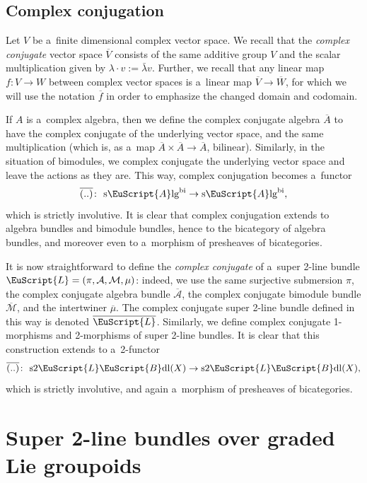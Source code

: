 \documentclass[10pt,a4paper]{amsart}
\numberwithin{equation}{section}
\def\mathscr#1{\EuScript{#1}}
\newcommand{\LineBdl}{\mathscr{L}\mathscr{B}\mathrm{dl}}
\newcommand{\stwoLineBdl}{\mathrm{s}2\LineBdl}
\newcommand{\Alg}{\Incl\mathrm{lg}}
\newcommand{\sAlg}{\mathrm{s}\Alg}
\newcommand{\sAlgbi}{\sAlg^{\mathrm{bi}}}
\newcommand{\Incl}{\mathscr{A}}
\begin{document}
\subsection{Complex conjugation}
\label{complex-conjugation}

Let $V$ be a~finite dimensional complex vector space. We recall that the \emph{complex conjugate} vector space $\overline{V}$ consists of the same additive group
$V$ and the scalar multiplication given by $\lambda \cdot v := \bar\lambda v$. Further, we recall that any linear map $f\colon V \to W$ between complex
vector spaces is a~linear map $\overline{V} \to \overline{W}$, for which we will use the notation $\overline{f}$ in order to emphasize the changed domain and codomain.


If $A$ is a~complex algebra, then we define the complex conjugate algebra $\overline{A}$ to have the complex conjugate of the underlying vector space, and the same multiplication (which is, as a~map $\overline{A} \times \overline{A} \to \overline{A}$, bilinear). Similarly, in the situation of bimodules, we complex conjugate the underlying vector space and leave the actions as they are. This way, complex conjugation becomes a~functor
\begin{equation*}
\overline{(..)}\colon\ \sAlgbi \to \sAlgbi,
\end{equation*}
which is strictly involutive.
It is clear that complex conjugation extends to algebra bundles and bimodule bundles, hence to the bicategory of algebra bundles, and moreover even to a~morphism of presheaves of bicategories.


It is now straightforward
to define the \emph{complex conjugate} of a~super 2-line bundle $\mathscr{L}=(\pi,\mathcal{A},\mathcal{M},\mu)$: indeed, we use the same surjective submersion
$\pi$, the complex conjugate algebra bundle $\overline{\mathcal{A}}$, the complex conjugate bimodule bundle $\overline{\mathcal{M}}$, and the intertwiner $\overline{\mu}$.
The complex conjugate super 2-line bundle defined in this way is denoted $\overline{\mathscr{L}}$. Similarly, we define complex conjugate 1-morphisms and 2-morphisms of super 2-line bundles.
It is clear that this construction extends to a~2-functor
\begin{equation}
\label{complex-conjugation-2-functor}
\overline{(..)} \colon\ \stwoLineBdl(X) \to \stwoLineBdl(X),
\end{equation}
which is strictly involutive, and again a~morphism of presheaves of bicategories.

\section{Super 2-line bundles over graded Lie groupoids}
\label{extension-to-graded-lie-groupoids}
\end{document}
